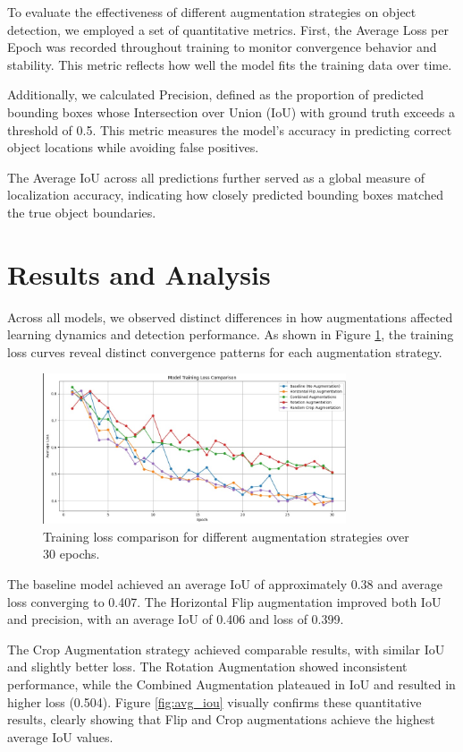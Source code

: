 \documentclass[12pt]{article}
\begin{document}
To evaluate the effectiveness of different augmentation strategies on object detection, we employed a set of quantitative metrics. First, the {Average Loss per Epoch} was recorded throughout training to monitor convergence behavior and stability. This metric reflects how well the model fits the training data over time.

Additionally, we calculated {Precision}, defined as the proportion of predicted bounding boxes whose Intersection over Union (IoU) with ground truth exceeds a threshold of 0.5. This metric measures the model's accuracy in predicting correct object locations while avoiding false positives.

The {Average IoU} across all predictions further served as a global measure of localization accuracy, indicating how closely predicted bounding boxes matched the true object boundaries.


\section{Results and Analysis}
Across all models, we observed distinct differences in how augmentations affected learning dynamics and detection performance. As shown in Figure \ref{fig:training_loss_comparison}, the training loss curves reveal distinct convergence patterns for each augmentation strategy.

\begin{figure}[H]
    \centering
    \includegraphics[width=0.8\textwidth]{training_loss_comparison.png}
    \caption{Training loss comparison for different augmentation strategies over 30 epochs.}
    \label{fig:training_loss_comparison}
\end{figure}

The baseline model achieved an average IoU of approximately 0.38 and average loss converging to 0.407. The Horizontal Flip augmentation improved both IoU and precision, with an average IoU of 0.406 and loss of 0.399.


The Crop Augmentation strategy achieved comparable results, with similar IoU and slightly better loss. The Rotation Augmentation showed inconsistent performance, while the Combined Augmentation plateaued in IoU and resulted in higher loss (0.504). Figure \ref{fig:avg_iou} visually confirms these quantitative results, clearly showing that Flip and Crop augmentations achieve the highest average IoU values.
\end{document}
